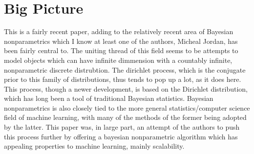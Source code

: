 \documentclass[11pt]{article}
\theoremstyle{definition}
\begin{document}
\section{Big Picture}
This is a fairly recent paper, adding to the relatively recent area of Bayesian nonparametrics which I know at least one of the authors, Micheal Jordan, has been fairly central to. The uniting thread of this field seems to be attempts to model objects which can have infinite dimmension with a countably infinite, nonparametric discrete distrubtion. The dirichlet process, which is the conjugate prior to this family of distributions, thus tends to pop up a lot, as it does here. This process, though a newer development, is based on the Dirichlet distribution, which has long been a tool of traditional Bayesian statistics. Bayesian nonparametrics is also closely tied to the more general statistics/computer science field of machine learning, with many of the methods of the former being adopted by the latter. This paper was, in large part, an attempt of the authors to push this process further by offering a bayesian nonparametric algorithm which has appealing properties to machine learning, mainly scalability.
\end{document}
